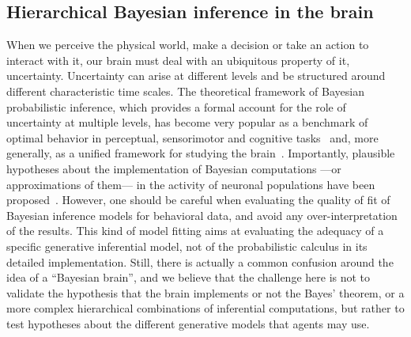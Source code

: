 \documentclass[10pt,letterpaper]{article}
\newcommand{\citep}[1]{\cite{#1}}
\newcommand{\AM}[1]{\textbf{\textcolor{blue}{[AM: #1]}}}
\begin{document}
\subsection{Hierarchical Bayesian inference in the brain}
When we perceive the physical world, make a decision or take an action to interact with it, our brain must deal with an ubiquitous property of it, uncertainty. Uncertainty can arise at different levels and be structured around different characteristic time scales. %
The theoretical framework of Bayesian probabilistic inference, which provides a formal account for the role of uncertainty at multiple levels, %
has become very popular as a benchmark of optimal behavior in perceptual, sensorimotor and cognitive tasks~\citep{KnillPouget2004} and, more generally, as a unified framework for studying the brain~\citep{Friston2010}. Importantly, plausible hypotheses about the implementation of Bayesian computations ---or approximations of them--- in the activity of neuronal populations have been proposed~\citep{Bastos12, Fetsch2012,Ma2006}. However, one should be careful when evaluating the quality of fit of Bayesian inference models for behavioral data, and avoid any over-interpretation of the results. This kind of model fitting aims at evaluating the adequacy of a specific generative inferential model, not of the probabilistic calculus in its detailed implementation.
Still, there is actually a common confusion around the idea of a ``Bayesian brain'', and
we believe that the challenge here is not to validate the hypothesis that the brain implements or not the Bayes' theorem, or a more complex hierarchical combinations of inferential computations, but rather to test hypotheses about the different generative models
that agents may use.
\end{document}
